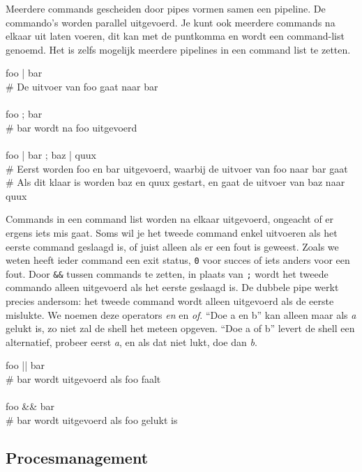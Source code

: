 Meerdere commands gescheiden door pipes vormen samen een pipeline. De commando's worden parallel uitgevoerd. Je kunt ook meerdere commands na elkaar uit laten voeren, dit kan met de puntkomma en wordt een command-list genoemd. Het is zelfs mogelijk meerdere pipelines in een command list te zetten.

\begin{bash}
\p[~] foo | bar\\
\# De uitvoer van foo gaat naar bar\\
\\
\p[~] foo ; bar\\
\# bar wordt na foo uitgevoerd\\
\\
\p[~] foo | bar ; baz | quux\\
\# Eerst worden foo en bar uitgevoerd, waarbij de uitvoer van foo naar bar gaat\\
\# Als dit klaar is worden baz en quux gestart, en gaat de uitvoer van baz naar quux\\
\end{bash}

Commands in een command list worden na elkaar uitgevoerd, ongeacht of er ergens iets mis gaat. Soms wil je het tweede command enkel uitvoeren als het eerste command geslaagd is, of juist alleen als er een fout is geweest. Zoals we weten heeft ieder command een exit status, \texttt{0} voor succes of iets anders voor een fout. Door \texttt{\&\&} tussen commands te zetten, in plaats van \texttt{;} wordt het tweede commando alleen uitgevoerd als het eerste geslaagd is. De dubbele pipe \texttt{\textbar{}\textbar{}} werkt precies andersom: het tweede command wordt alleen uitgevoerd als de eerste mislukte. We noemen deze operators \emph{en} en \emph{of}. ``Doe a en b'' kan alleen maar als \emph{a} gelukt is, zo niet zal de shell het meteen opgeven. ``Doe a of b'' levert de shell een alternatief, probeer eerst \emph{a}, en als dat niet lukt, doe dan \emph{b}.

\begin{bash}
\p[~] foo || bar\\
\# bar wordt uitgevoerd als foo faalt\\
\\
\p[~] foo && bar\\
\# bar wordt uitgevoerd als foo gelukt is\\
\end{bash}

\subsection{Procesmanagement}\label{procesmanagement}


